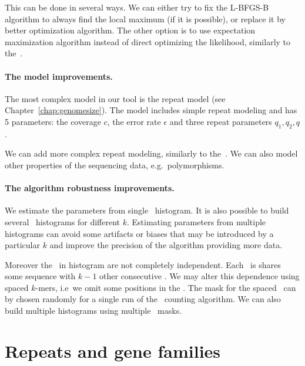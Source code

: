 This can be done in several ways. We can either try to fix the L-BFGS-B algorithm to always find the local maximum (if it is possible), or replace it by better optimization algorithm. The other option is to use expectation maximization algorithm instead of direct optimizing the likelihood, similarly to the~\cite{waterman}.

\paragraph{The model improvements.}
The most complex model in our tool is the repeat model (see Chapter~\ref{chap:genomesize}). The model includes simple repeat modeling and has 5 parameters: the coverage $c$, the error rate $\epsilon$ and three repeat parameters $q_1, q_2, q$.

We can add more complex repeat modeling, similarly to the~\cite{williams}. We can also model other properties of the sequencing data, e.g.\ polymorphisms.

\paragraph{The algorithm robustness improvements.}

We estimate the parameters from single \kmer\ histogram. It is also possible to build several \kmer\ histograms for different $k$. Estimating parameters from multiple histograms can avoid some artifacts or biases that may be introduced by a particular $k$ and improve the precision of the algorithm providing more data.

Moreover the \kmers\ in histogram are not completely independent. Each \kmer\ is shares some sequence with $k-1$ other consecutive \kmers. We may alter this dependence using spaced $k$-mers, i.e\ we omit some positions in the \kmer.
The mask for the spaced \kmers\ can by chosen randomly for a single run of the \kmer\ counting algorithm. We can also build multiple histograms using multiple \kmer\ masks.

\section{Repeats and gene families}\label{sect:repeats-families}

